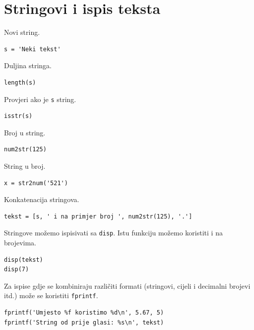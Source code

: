 \documentclass[a4paper, 10pt]{article}
\begin{document}

\section{Stringovi i ispis teksta}

Novi string.

\begin{lstlisting}
s = 'Neki tekst'
\end{lstlisting}

Duljina stringa.

\begin{lstlisting}
length(s)
\end{lstlisting}

Provjeri ako je \texttt{s} string.

\begin{lstlisting}
isstr(s)
\end{lstlisting}

Broj u string.

\begin{lstlisting}
num2str(125)
\end{lstlisting}

String u broj.

\begin{lstlisting}
x = str2num('521')
\end{lstlisting}

Konkatenacija stringova.

\begin{lstlisting}
tekst = [s, ' i na primjer broj ', num2str(125), '.']
\end{lstlisting}

Stringove možemo ispisivati sa \texttt{disp}. Istu funkciju možemo koristiti i na brojevima.

\begin{lstlisting}
disp(tekst)
disp(7)
\end{lstlisting}

Za ispise gdje se kombiniraju različiti formati (stringovi, cijeli i decimalni brojevi itd.) može se koristiti \texttt{fprintf}.

\begin{lstlisting}
fprintf('Umjesto %f koristimo %d\n', 5.67, 5)
fprintf('String od prije glasi: %s\n', tekst)
\end{lstlisting}
\end{document}
